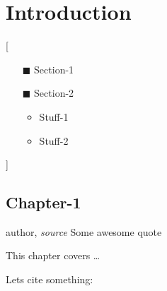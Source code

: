 \part{Introduction}[
\vspace{1cm}
\begin{center}
\begin{minipage}{.5\textwidth}
\small{
\begin{enumerate}
\item[$\blacksquare$] Section-1
\item[$\blacksquare$] Section-2
\begin{itemize}
\item Stuff-1
\item Stuff-2
\end{itemize}
\end{enumerate}
}
\end{minipage}
\end{center}

]
\clearpage
\chapter{Chapter-1}
\label{chap:intro}

\begin{chapquote}{author, \textit{source}}
Some awesome quote
\end{chapquote}



\mbox{}
\vfill


This chapter covers \dots

\clearpage

Lets cite something: \cite{Bouchaud2013}

\lipsum


\afterpage{\blankpage}